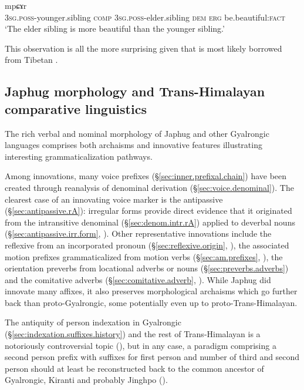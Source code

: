 \begin{exe}
\ex \label{ex:sAz.mpCAr}
\gll  [ɯ-ʁi sɤz] [ɯ-pi nɯ kɯ] mpɕɤr  \\
\textsc{3sg}.\textsc{poss}-younger.sibling \textsc{comp} \textsc{3sg}.\textsc{poss}-elder.sibling \textsc{dem} \textsc{erg} be.beautiful:\textsc{fact} \\
\glt `The elder sibling is more beautiful than the younger sibling.' 
\end{exe}

This observation is all the more surprising given that  is most likely borrowed from Tibetan \citep{jacques16comparative}.

\subsection{Japhug morphology and Trans-Himalayan comparative linguistics} \label{sec:comparative.morphology.intro}
The rich verbal and nominal morphology of Japhug and other Gyalrongic languages comprises both archaisms  and innovative features illustrating interesting grammaticalization pathways.

Among innovations, many voice prefixes (§\ref{sec:inner.prefixal.chain}) have been created through reanalysis of denominal derivation (§\ref{sec:voice.denominal}). The clearest case of an innovating voice marker is the antipassive  (§\ref{sec:antipassive.rA}): irregular forms provide direct evidence  that it originated from the intransitive denominal   (§\ref{sec:denom.intr.rA}) applied to deverbal nouns (§\ref{sec:antipassive.irr.form},  \citealt{jacques14antipassive}). Other representative innovations include the reflexive  from an incorporated pronoun (§\ref{sec:reflexive.origin}, \citealt{jacques10refl}), the associated motion prefixes grammaticalized from motion verbs (§\ref{sec:am.prefixes}, \citealt{jacques13harmonization}), the orientation preverbs from locational adverbs or nouns (§\ref{sec:preverbs.adverbs}) and the comitative adverbs (§\ref{sec:comitative.adverb}, \citealt{jacques17comitative}).
While Japhug did innovate many affixes, it also preserves morphological archaisms which go further back than proto-Gyalrongic, some potentially even up to proto-Trans-Himalayan.

The antiquity of person indexation in Gyalrongic (§\ref{sec:indexation.suffixes.history}) and the rest of Trans-Himalayan is a notoriously controversial topic (\citealt{bauman75, delancey89agreement, lapolla92, driem93agreement}), but in any case, a paradigm comprising a second person prefix with suffixes for first person and number of third and second person should at least be reconstructed back to the common ancestor of Gyalrongic, Kiranti and probably Jinghpo (\citealt{jacques12agreement, delancey14second, jacques16th}).

